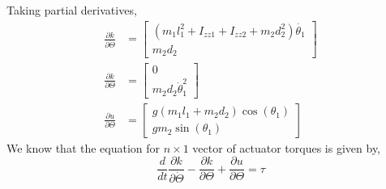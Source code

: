 \documentclass[a4paper]{article}
\begin{document}
\begin{qalist}
			Taking partial derivatives, 
			\begin{align}
				\label{eq:PD1}\frac{\partial k}{\partial \dot{\Theta}} &= \begin{bmatrix} ({m}_{1} {l}^{2}_{1} + {I}_{zz1} + {I}_{zz2} + {m}_{2}{d}^{2}_{2})\dot{{\theta}_{1}} \\ {m}_{2} {d}_{2} \end{bmatrix} \\ 
				\label{eq:PD2} \frac{\partial k}{\partial \Theta} &= \begin{bmatrix} 0 \\ {m}_{2}{d}_{2}{\dot{\theta}}^{2}_{1} \end{bmatrix} \\
				\label{eq:PD3} \frac{\partial u}{\partial \Theta} &= \begin{bmatrix}g({m}_{1} {l}_{1} + {m}_{2}{d}_{2}) \cos({\theta}_{1}) \\ g{m}_{2} \sin ({\theta}_{1})\end{bmatrix}
			\end{align}
			We know that the equation for $n \times 1$ vector of actuator torques is given by, 
			\begin{equation}\label{eq:ActTorq}
				\frac{d}{dt} \frac{\partial k}{\partial \dot{\Theta}} - \frac{\partial k}{\partial \Theta} + \frac{\partial u}{\partial \Theta} = \tau
			\end{equation}
			

\end{qalist}
\end{document}
